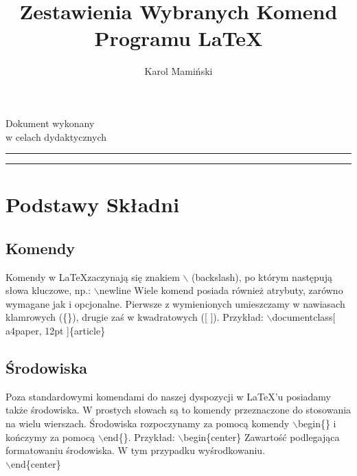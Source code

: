 \documentclass[a4paper, 12pt]{article}
\author{Karol Mamiński}
\title{Zestawienia Wybranych Komend Programu \LaTeX}
\date{}
\makeatletter
\newcommand{\linia}{\rule{\linewidth}{0.4mm}}
\renewcommand{\maketitle}{\begin{titlepage}
    \vspace*{1cm}
    \begin{center}\small
    Dokument wykonany\\
    w celach dydaktycznych
    \end{center}
    \vspace{2cm}
    \noindent\linia
    \begin{center}
      \LARGE \@title
         \end{center}
     \linia
    \vspace*{\stretch{6}}
    \begin{center}
    \@author
    \end{center}
  \end{titlepage}%
}
\makeatother
\begin{document}
\maketitle
\tableofcontents
\newpage

\section{Podstawy Składni} \label{sec:podstawy składni}
\subsection{Komendy}
Komendy w \LaTeX zaczynają się znakiem $\backslash$ (backslash), po którym następują słowa kluczowe, np.:\newline
$\backslash$newline\newline
Wiele komend posiada również atrybuty, zarówno wymagane jak i opcjonalne. Pierwsze z wymienionych umieszczamy w nawiasach klamrowych (\{\}), drugie zaś w kwadratowych ([ ]). Przykład:\newline
$\backslash$documentclass[ a4paper, 12pt ]\{article\}

\subsection{Środowiska}
Poza standardowymi komendami do naszej dyspozycji w \LaTeX 'u posiadamy także środowiska. W prostych słowach są to komendy przeznaczone do stosowania na wielu wierszach.\newline
Środowiska rozpoczynamy za pomocą komendy $\backslash$begin\{\} i kończymy za pomocą $\backslash$end\{\}. Przykład:\newline
$\backslash$begin\{center\}\newline
Zawartość podlegająca formatowaniu środowiska. W tym przypadku wyśrodkowaniu. \\
$\backslash$end\{center\}
\end{document}

